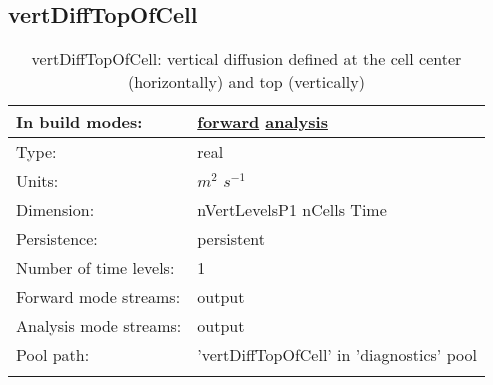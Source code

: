 \subsection[vertDiffTopOfCell]{vertDiffTopOfCell}
\label{subsec:var_sec_diagnostics_vertDiffTopOfCell}
\begin{center}
\begin{longtable}{| p{2.0in} | p{4.0in} |}
        \hline 
        In build modes: & \hyperref[subsec:forward_var_tab_diagnostics]{forward} \hyperref[subsec:analysis_var_tab_diagnostics]{analysis} \\
        \hline 
        Type: & real \\
        \hline 
        Units: & $m^2$ $s^{-1}$ \\
        \hline 
        Dimension: & nVertLevelsP1 nCells Time \\
        \hline 
        Persistence: & persistent \\
        \hline 
        Number of time levels: & 1 \\
        \hline 
		 Forward mode streams: &  output \\
        \hline 
		 Analysis mode streams: &  output \\
        \hline 
            Pool path: & 'vertDiffTopOfCell' in 'diagnostics' pool
 \\
		 \hline 
    \caption{vertDiffTopOfCell: vertical diffusion defined at the cell center (horizontally) and top (vertically)}
\end{longtable}
\end{center}
